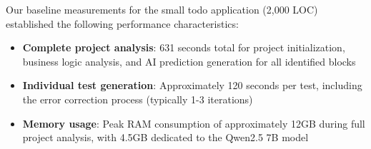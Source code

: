 Our baseline measurements for the small todo application (2,000 LOC) established the following performance characteristics:

\begin{itemize}
    \item \textbf{Complete project analysis}: 631 seconds total for project initialization, business logic analysis, and AI prediction generation for all identified blocks
    \item \textbf{Individual test generation}: Approximately 120 seconds per test, including the error correction process (typically 1-3 iterations)
    \item \textbf{Memory usage}: Peak RAM consumption of approximately 12GB during full project analysis, with 4.5GB dedicated to the Qwen2.5 7B model
\end{itemize}

\begin{table}[ht]
    \centering
    \caption{Component Processing Time by Project Size (absolute times in seconds)}
\end{table}

